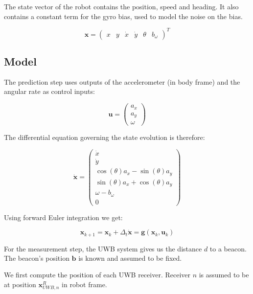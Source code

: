 \documentclass[a4paper, 12pt]{scrreprt}
\begin{document}
The state vector of the robot contains the position, speed and heading.
It also contains a constant term for the gyro bias, used to model the noise on the bias.


\begin{equation}
\mathbf{x} = \begin{pmatrix} x & y & \dot{x} & \dot{y} & \theta & b_{\omega} \end{pmatrix}^T
\end{equation}

\subsection{Model}

The prediction step uses outputs of the accelerometer (in body frame) and the angular rate as control inputs:

\begin{equation}
\mathbf{u} = \begin{pmatrix}
    a_x\\
    a_y\\
    \omega
\end{pmatrix}
\end{equation}

The differential equation governing the state evolution is therefore:

\begin{equation}
\mathbf{\dot{x}} = \begin{pmatrix}
\dot{x}\\
\dot{y}\\
\cos(\theta) a_x - \sin(\theta) a_y \\
\sin(\theta) a_x + \cos(\theta) a_y \\
\omega - b_{\omega}\\
0
\end{pmatrix}
\end{equation}

Using forward Euler integration we get:

\begin{equation}
\mathbf{x}_{k+1} = \mathbf{x}_{k} + \Delta_t \mathbf{\dot{x}} = \mathbf{g}\left(\mathbf{x}_{k}, \mathbf{u}_k\right)
\end{equation}

For the measurement step, the UWB system gives us the distance $d$ to a beacon.
The beacon's position $\mathbf{b}$ is known and assumed to be fixed.

We first compute the position of each UWB receiver. Receiver $n$ is assumed to be at position $\mathbf{x}_{UWB,n}^R$ in robot frame.
\end{document}
